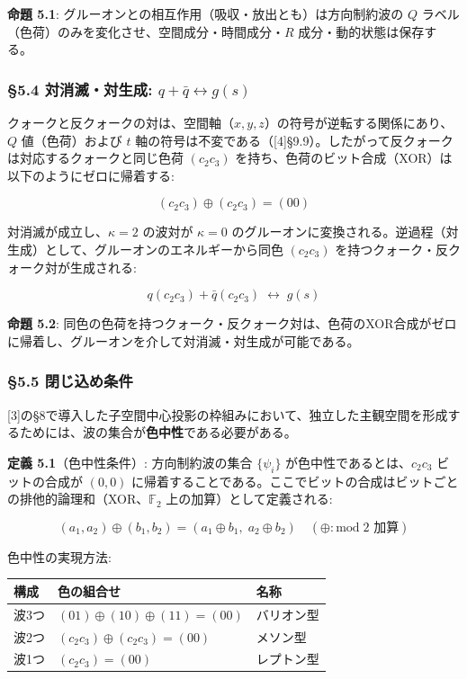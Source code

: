 \documentclass[
  a4paper,11pt]{ltjsarticle}
\newcounter{none}
\theoremstyle{definition}
\theoremstyle{remark}
\begin{document}
\textbf{命題 5.1}:
グルーオンとの相互作用（吸収・放出とも）は方向制約波の \(Q\)
ラベル（色荷）のみを変化させ、空間成分・時間成分・\(R\)
成分・動的状態は保存する。

\subsubsection{\texorpdfstring{§5.4 対消滅・対生成:
\(q + \bar{q} \leftrightarrow g(s)\)}{§5.4 対消滅・対生成: q + \textbackslash bar\{q\} \textbackslash leftrightarrow g(s)}}\label{ux5bfeux6d88ux6ec5ux5bfeux751fux6210-q-barq-leftrightarrow-gs}

クォークと反クォークの対は、空間軸（\(x, y, z\)）の符号が逆転する関係にあり、\(Q\)
値（色荷）および \(t\)
軸の符号は不変である（{[}4{]}§9.9）。したがって反クォークは対応するクォークと同じ色荷
\((c_2 c_3)\)
を持ち、色荷のビット合成（XOR）は以下のようにゼロに帰着する:

\[(c_2 c_3) \oplus (c_2 c_3) = (00)\]

対消滅が成立し、\(\kappa = 2\) の波対が \(\kappa = 0\)
のグルーオンに変換される。逆過程（対生成）として、グルーオンのエネルギーから同色
\((c_2 c_3)\) を持つクォーク・反クォーク対が生成される:

\[q(c_2 c_3) + \bar{q}(c_2 c_3) \;\longleftrightarrow\; g(s)\]

\textbf{命題 5.2}:
同色の色荷を持つクォーク・反クォーク対は、色荷のXOR合成がゼロに帰着し、グルーオンを介して対消滅・対生成が可能である。

\subsubsection{§5.5
閉じ込め条件}\label{ux9589ux3058ux8fbcux3081ux6761ux4ef6}

{[}3{]}の§8で導入した子空間中心投影の枠組みにおいて、独立した主観空間を形成するためには、波の集合が\textbf{色中性}である必要がある。

\textbf{定義 5.1}（色中性条件）: 方向制約波の集合 \(\{\psi_i\}\)
が色中性であるとは、\(c_2 c_3\) ビットの合成が \((0, 0)\)
に帰着することである。ここでビットの合成はビットごとの排他的論理和（XOR、\(\mathbb{F}_2\)
上の加算）として定義される:

\[(a_1, a_2) \oplus (b_1, b_2) = (a_1 \oplus b_1,\; a_2 \oplus b_2) \quad (\oplus: \text{mod}\; 2 \text{ 加算})\]

色中性の実現方法:

{\def\LTcaptype{none} %
\begin{longtable}[]{@{}lll@{}}
\toprule\noalign{}
構成 & 色の組合せ & 名称 \\
\midrule\noalign{}
\endhead
\bottomrule\noalign{}
\endlastfoot
波3つ & \((01) \oplus (10) \oplus (11) = (00)\) & バリオン型 \\
波2つ & \((c_2 c_3) \oplus (c_2 c_3) = (00)\) & メソン型 \\
波1つ & \((c_2 c_3) = (00)\) & レプトン型 \\
\end{longtable}
}
\end{document}
